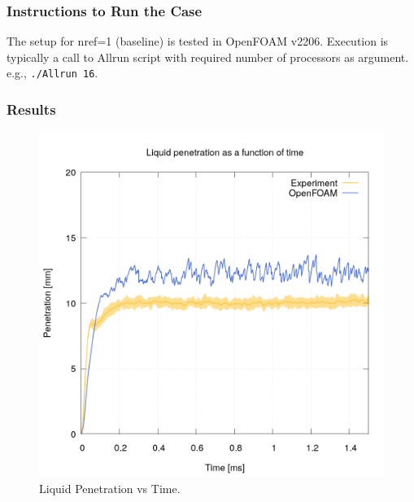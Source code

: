 \subsubsection*{Instructions to Run the Case}
The setup for nref=1 (baseline) is tested in OpenFOAM v2206. Execution is typically a call to Allrun script with required number of processors as argument. e.g., \texttt{./Allrun 16}.

\subsubsection*{Results}
\begin{figure}[H]
    \centering
    \includegraphics[width=0.9\linewidth]{figs/MB18/liquid_penetration.png}
    \caption{Liquid Penetration vs Time.}
    \label{fig:enter-label}
\end{figure}

